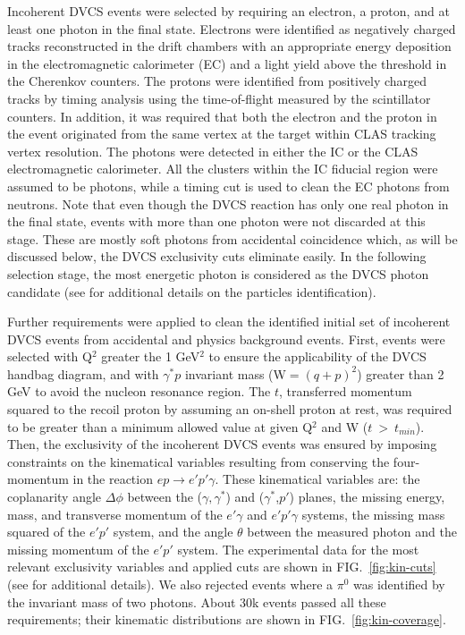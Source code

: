 \documentclass[twocolumn,nofootinbib,showpacs,prl,superscriptaddress,secnumarabic,amssymb,nobibnotes,aps,floatfix]{revtex4}
\begin{document}
Incoherent DVCS events were selected by requiring an electron, a proton, and at 
least one photon in the final state. Electrons were identified as negatively 
charged tracks reconstructed in the drift chambers with an appropriate energy 
deposition in the electromagnetic calorimeter (EC) and a light yield above the 
threshold in the Cherenkov counters. The protons were identified from 
positively charged tracks by timing analysis using the time-of-flight measured 
by the scintillator counters.  In addition, it was required that both the 
electron and the proton in the event originated from the same vertex at the 
target within CLAS tracking vertex resolution. The photons were detected in 
either the IC or the CLAS electromagnetic calorimeter. All the clusters within 
the IC fiducial region were assumed to be photons, while a timing cut is used 
to clean the EC photons from neutrons. Note that even though the DVCS reaction 
has only one real photon in the final state, events with more than one photon 
were not discarded at this stage. These are mostly soft photons from accidental 
coincidence which, as will be discussed below, the DVCS exclusivity cuts 
eliminate easily. In the following selection stage, the most energetic photon 
is considered as the DVCS photon candidate (see \cite{Hattawy:thesis} for 
additional details on the particles identification).  

Further requirements were applied to clean the identified initial set of 
incoherent DVCS events from accidental and physics background events. First, 
events were selected with Q$^{2}$ greater the 1 GeV$^2$ to ensure the 
applicability of the DVCS handbag diagram, and with $\gamma^{*}p$ invariant 
mass (W$=(q+p)^2$) greater than 2 GeV to avoid the nucleon resonance region.  
The $t$, transferred momentum squared to the recoil proton by assuming an 
on-shell proton at rest, was required to be greater than a minimum allowed 
value at given Q$^2$ and W ($t~>~t_{min}$).  Then, the exclusivity of the 
incoherent DVCS events was ensured by imposing constraints on the kinematical 
variables resulting from conserving the four-momentum in the reaction 
$ep\rightarrow e'p'\gamma$. These kinematical variables are: the coplanarity 
angle $\Delta\phi$ between the ($\gamma,\gamma^*$) and ($\gamma^*$,$p'$) 
planes, the missing energy, mass, and transverse momentum of the $e'\gamma$ and 
$e'p'\gamma$ systems, the missing mass squared of the $e'p'$ system, and the 
angle $\theta$ between the measured photon and the missing momentum of the 
$e'p'$ system. The experimental data for the most relevant exclusivity 
variables and applied cuts are shown in FIG.~\ref{fig:kin-cuts} (see 
\cite{Hattawy:thesis} for additional details). We also rejected events where a 
$\pi^0$ was identified by the invariant mass of two photons. About 30k events 
passed all these requirements; their kinematic distributions are shown in 
FIG.~\ref{fig:kin-coverage}.  
\end{document}
